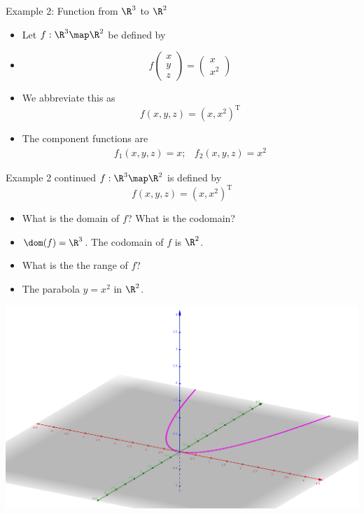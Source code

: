 \documentclass{beamer}
\begin{document}
\begin{frame}{Example 2: Function from $\R^3$ to $\R^2$}
\begin{itemize}
\item Let $f:\R^3\map\R^2$ be defined by
\item
$$
f
\begin{pmatrix}
x \\ y \\ z
\end{pmatrix}
=
\begin{pmatrix}
x \\ x^2
\end{pmatrix}
$$
\item We abbreviate this as
$$f(x,y,z) = (x, x^2)^{\text{T}}$$
\item The component functions are
$$
\begin{matrix}
f_1(x,y,z) = x; & f_2(x,y,z) = x^2
\end{matrix}
$$
\end{itemize}
\end{frame}


\begin{frame}{Example 2 continued}
$f:\R^3\map\R^2$ is defined by
$$f(x,y,z) = (x, x^2)^{\text{T}}$$
\begin{itemize}
\item What is the domain of $f$? What is the codomain?
\item $\dom(f) =\R^3$. The codomain of $f$ is $\R^2$.
\item What is the the range of $f$?
\item The parabola $y=x^2$ in  $\R^2$.
\end{itemize}
\pause
\includegraphics[scale=0.1]{project-to-parabola}
\end{frame}
\end{document}
